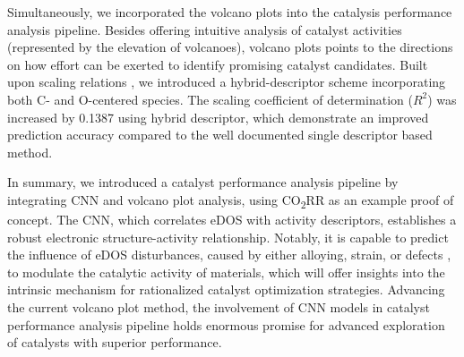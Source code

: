 Simultaneously, we incorporated the volcano plots into the catalysis performance analysis pipeline.
Besides offering intuitive analysis of catalyst activities (represented by the elevation of volcanoes),
volcano plots points to the directions on how effort can be exerted to identify promising catalyst candidates.
Built upon scaling relations \cite{peterson2012activity}, we introduced a hybrid-descriptor scheme
incorporating both C- and O-centered species.
The scaling coefficient of determination ($R^2$) was increased by 0.1387 using hybrid descriptor,
which demonstrate an improved prediction accuracy compared to the well documented single descriptor based method.

In summary, we introduced a catalyst performance analysis pipeline by
integrating CNN and volcano plot analysis, using CO\textsubscript{2}RR as an example proof of concept.
The CNN, which correlates eDOS with activity descriptors, establishes a robust electronic structure-activity relationship.
Notably, it is capable to predict the influence of eDOS disturbances,
caused by either alloying, strain, or defects \cite{norskov2011density, bera2017density, kusada2019emergence},
to modulate the catalytic activity of materials,
which will offer insights into the intrinsic mechanism for rationalized catalyst optimization strategies.
Advancing the current volcano plot method,
the involvement of CNN models in catalyst performance analysis pipeline holds enormous promise
for advanced exploration of catalysts with superior performance.
